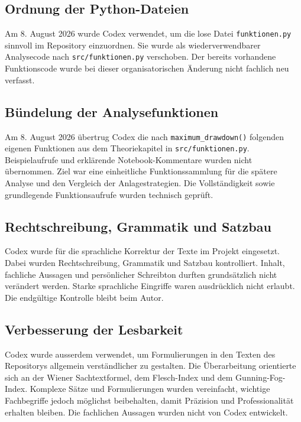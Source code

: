 \documentclass[
  ngerman,
  a4paper,
  DIV=11,
  oneside]{scrreprt}
\begin{document}
\subsection{Ordnung der
Python-Dateien}\label{ordnung-der-python-dateien}

Am 8. August 2026 wurde Codex verwendet, um die lose Datei
\texttt{funktionen.py} sinnvoll im Repository einzuordnen. Sie wurde als
wiederverwendbarer Analysecode nach \texttt{src/funktionen.py}
verschoben. Der bereits vorhandene Funktionscode wurde bei dieser
organisatorischen Änderung nicht fachlich neu verfasst.

\subsection{Bündelung der
Analysefunktionen}\label{buxfcndelung-der-analysefunktionen}

Am 8. August 2026 übertrug Codex die nach \texttt{maximum\_drawdown()}
folgenden eigenen Funktionen aus dem Theoriekapitel in
\texttt{src/funktionen.py}. Beispielaufrufe und erklärende
Notebook-Kommentare wurden nicht übernommen. Ziel war eine einheitliche
Funktionssammlung für die spätere Analyse und den Vergleich der
Anlagestrategien. Die Vollständigkeit sowie grundlegende
Funktionsaufrufe wurden technisch geprüft.

\subsection{Rechtschreibung, Grammatik und
Satzbau}\label{rechtschreibung-grammatik-und-satzbau}

Codex wurde für die sprachliche Korrektur der Texte im Projekt
eingesetzt. Dabei wurden Rechtschreibung, Grammatik und Satzbau
kontrolliert. Inhalt, fachliche Aussagen und persönlicher Schreibton
durften grundsätzlich nicht verändert werden. Starke sprachliche
Eingriffe waren ausdrücklich nicht erlaubt. Die endgültige Kontrolle
bleibt beim Autor.

\subsection{Verbesserung der
Lesbarkeit}\label{verbesserung-der-lesbarkeit}

Codex wurde ausserdem verwendet, um Formulierungen in den Texten des
Repositorys allgemein verständlicher zu gestalten. Die Überarbeitung
orientierte sich an der Wiener Sachtextformel, dem Flesch-Index und dem
Gunning-Fog-Index. Komplexe Sätze und Formulierungen wurden vereinfacht,
wichtige Fachbegriffe jedoch möglichst beibehalten, damit Präzision und
Professionalität erhalten bleiben. Die fachlichen Aussagen wurden nicht
von Codex entwickelt.
\end{document}
